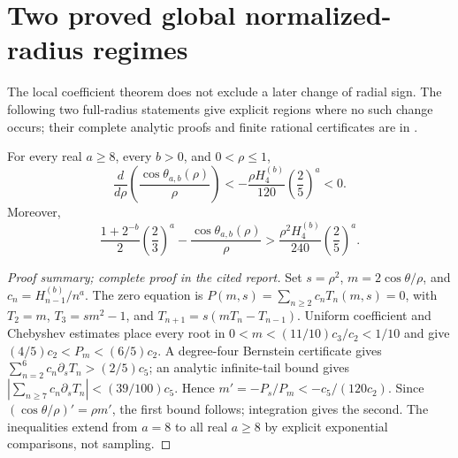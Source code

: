 \section{Two proved global normalized-radius regimes}
\label{grm:sec:global-radius}

The local coefficient theorem does not exclude a later change of radial
sign. The following two full-radius statements give explicit regions
where no such change occurs; their complete analytic proofs and finite
rational certificates are in \cite{grm:report}.

\begin{theorem}
\label{grm:thm:outer}
For every real $a\ge8$, every $b>0$, and $0<\rho\le1$,
\[
 \frac{d}{d\rho}\left(\frac{\cos\theta_{a,b}(\rho)}\rho\right)
 <-\frac{\rho H_4^{(b)}}{120}\left(\frac25\right)^a<0.
\]
Moreover,
\[
 \frac{1+2^{-b}}2\left(\frac23\right)^a
 -\frac{\cos\theta_{a,b}(\rho)}\rho
 >\frac{\rho^2 H_4^{(b)}}{240}\left(\frac25\right)^a.
\]
\end{theorem}
\begin{proof}[Proof summary; complete proof in the cited report]
Set $s=\rho^2$, $m=2\cos\theta/\rho$, and
$c_n=H_{n-1}^{(b)}/n^a$. The zero equation is
$P(m,s)=\sum_{n\ge2}c_nT_n(m,s)=0$, with
$T_2=m$, $T_3=sm^2-1$, and $T_{n+1}=s(mT_n-T_{n-1})$.
Uniform coefficient and Chebyshev estimates place every root in
$0<m<(11/10)c_3/c_2<1/10$ and give
$(4/5)c_2<P_m<(6/5)c_2$.
A degree-four Bernstein certificate gives
$\sum_{n=2}^6c_n\partial_sT_n>(2/5)c_5$; an analytic infinite-tail
bound gives $|\sum_{n\ge7}c_n\partial_sT_n|<(39/100)c_5$.
Hence $m'=-P_s/P_m<-c_5/(120c_2)$.
Since $(\cos\theta/\rho)'=\rho m'$, the first bound follows;
integration gives the second. The inequalities extend from $a=8$ to
all real $a\ge8$ by explicit exponential comparisons, not sampling.
\end{proof}

